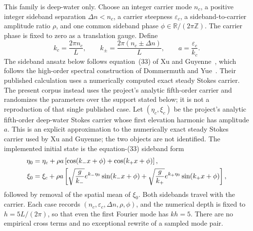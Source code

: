 \documentclass[11pt]{article}
\newcommand{\R}{\mathbb R}
\newcommand{\eps}{\varepsilon}
\begin{document}
This family is deep-water only.  Choose an integer carrier mode $n_c$, a
positive integer sideband separation $\Delta n<n_c$, a carrier steepness
$\eps_c$, a sideband-to-carrier amplitude ratio $\rho$, and one common
sideband phase $\phi\in\R/(2\pi\mathbb Z)$.  The carrier phase is fixed to zero as a translation
gauge.  Define
\begin{equation}
  k_c=\frac{2\pi n_c}{L},\qquad
  k_\pm=\frac{2\pi(n_c\pm\Delta n)}{L},\qquad
  a=\frac{\eps_c}{k_c}.
  \label{eq:bf-wavenumbers}
\end{equation}
The sideband ansatz below follows equation~(33) of Xu and
Guyenne~\cite{xu2009}, which follows the high-order spectral construction of
Dommermuth and Yue~\cite{dommermuth1987}.  Their published calculation uses a
numerically computed exact steady Stokes carrier.  The present corpus instead
uses the project's analytic fifth-order carrier and randomizes the parameters
over the support stated below; it is not a reproduction of that single
published case.
Let $(\eta_c,\xi_c)$ be the project's analytic fifth-order deep-water
Stokes carrier whose first elevation harmonic has amplitude $a$.  This is
an explicit approximation to the numerically exact steady Stokes carrier
used by Xu and Guyenne; the two objects are not identified.  The implemented
initial state is the equation-(33) sideband form
\begin{align}
  \eta_0
    &=\eta_c+\rho a\left[
      \cos(k_-x+\phi)+\cos(k_+x+\phi)\right],\notag\\
  \xi_0
    &=\xi_c+\rho a\left[
      \sqrt{\frac{g}{k_-}}e^{k_-\eta_0}\sin(k_-x+\phi)
      +
      \sqrt{\frac{g}{k_+}}e^{k_+\eta_0}\sin(k_+x+\phi)
      \right],
  \label{eq:bf-constructor}
\end{align}
followed by removal of the spatial mean of $\xi_0$.  Both sidebands travel
with the carrier.  Each case records
$(n_c,\eps_c,\Delta n,\rho,\phi)$, and the numerical depth is fixed to
$h=5L/(2\pi)$, so that even the first Fourier mode has $kh=5$.  There are no
empirical cross terms and no exceptional rewrite of a sampled mode pair.
\end{document}
